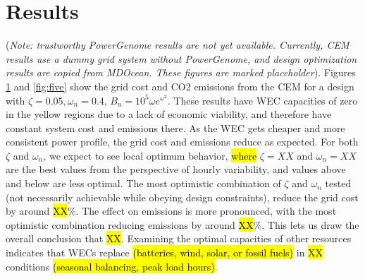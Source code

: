 \documentclass[10pt,twoside]{article}
\begin{document}
\begin{figure}[b]
\begin{minipage}[b]{0.435\textwidth}
    \label{fig:four}
\end{minipage}
\end{figure}

\section{Results}
(\textit{Note: trustworthy PowerGenome results are not yet available. Currently, CEM results use a dummy grid system without PowerGenome, and design optimization results are copied from MDOcean. These figures are marked placeholder}).
Figures \ref{fig:four} and \ref{fig:five} show the grid cost and CO2 emissions from the CEM for a design with $\zeta=0.05, \omega_n=0.4$, $B_{u}=10^5\omega e^{\omega^2}$.
These results have WEC capacities of zero in the yellow regions due to a lack of economic viability, and therefore have constant system cost and emissions there.
As the WEC gets cheaper and more consistent power profile, the grid cost and emissions reduce as expected.
For both $\zeta$ and $\omega_n$, we expect to see local optimum behavior, \hl{where} $\zeta=XX$ and $\omega_n=XX$ are the best values from the perspective of hourly variability, and values above and below are less optimal.
The most optimistic combination of $\zeta$ and $\omega_n$ tested (not necessarily achievable while obeying design constraints), reduce the grid cost by around \hl{XX}\%.
The effect on emissions is more pronounced, with the most optimistic combination reducing emissions by around \hl{XX}\%.
This lets us draw the overall conclusion that \hl{XX}.
Examining the optimal capacities of other resources indicates that WECs replace \hl{(batteries, wind, solar, or fossil fuels)} in \hl{XX} conditions \hl{(seasonal balancing, peak load hours)}.
\end{document}
